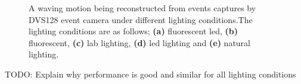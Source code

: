 \begin{figure}[htb]%
    \centering
    \qquad
    \qquad
    \qquad
    \qquad
    \caption{A waving motion being reconstructed from events captures by DVS128 event camera under different lighting conditions.The lighting conditions are as follows; \textbf{(a)} fluorescent led, \textbf{(b)} fluorescent, \textbf{(c)} lab lighting, \textbf{(d)} led lighting and \textbf{(e)} natural lighting.}%
    \label{fig:wave_in_lightings_reconstructions}%
\end{figure}

\color{red} TODO: Explain why performance is good and similar for all lighting conditions \color{black}

